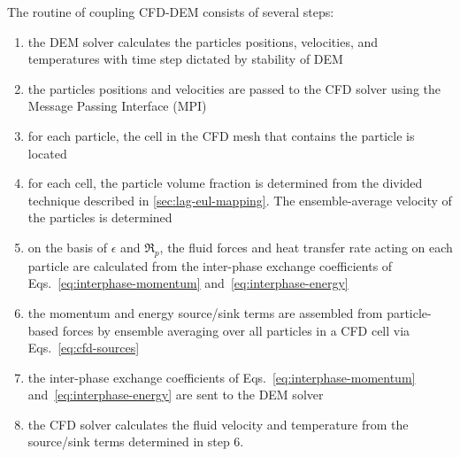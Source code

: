 
The routine of coupling CFD-DEM consists of several steps:
\begin{enumerate}
\item the DEM solver calculates the particles positions, velocities, and temperatures with time step dictated by stability of DEM
\item the particles positions and velocities are passed to the CFD solver using the Message Passing Interface (MPI)
\item for each particle, the cell in the CFD mesh that contains the particle is located
\item for each cell, the particle volume fraction is determined from the divided technique described in \cref{sec:lag-eul-mapping}. The ensemble-average velocity of the particles is determined
\item on the basis of $\epsilon$ and $\Re_p$, the fluid forces and heat transfer rate acting on each particle are calculated from the inter-phase exchange coefficients of Eqs.~\ref{eq:interphase-momentum} and~\ref{eq:interphase-energy}
\item the momentum and energy source/sink terms are assembled from particle-based forces by ensemble averaging over all particles in a CFD cell via Eqs.~\ref{eq:cfd-sources}
\item the inter-phase exchange coefficients of Eqs.~\ref{eq:interphase-momentum} and~\ref{eq:interphase-energy} are sent to the DEM solver
\item the CFD solver calculates the fluid velocity and temperature from the source/sink terms determined in step 6.
\end{enumerate}

%
%
